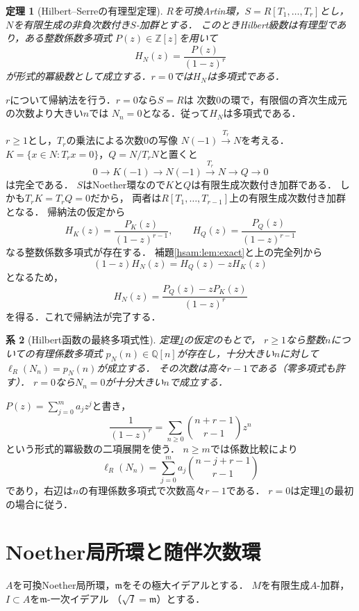\documentclass[a5paper,10pt,onecolumn]{jsarticle}
\makeatletter
\theoremstyle{mathnotetheorem}
\newtheorem{theorem}{定理}[section]
\newtheorem{corollary}[theorem]{系}
\renewcommand{\proofname}{証明}
\renewenvironment{proof}[1][\proofname]{%
  \par\pushQED{\qed}\normalfont\topsep4\p@\@plus2\p@\relax
  \trivlist\item[\hskip\labelsep\bfseries #1]\ignorespaces
}{\popQED\endtrivlist\@endpefalse}
\makeatother
\begin{document}
\begin{theorem}[Hilbert--Serreの有理型定理]\label{hsam:thm:HS}
$R$を可換Artin環，$S=R[T_1,\ldots,T_r]$とし，
$N$を有限生成の非負次数付き$S$-加群とする．
このときHilbert級数は有理型であり，ある整数係数多項式
$P(z)\in\mathbb Z[z]$を用いて
\[
 H_N(z)=\frac{P(z)}{(1-z)^r}
\]
が形式的冪級数として成立する．$r=0$では$H_N$は多項式である．
\end{theorem}
\begin{proof}
$r$について帰納法を行う．$r=0$なら$S=R$は
次数0の環で，有限個の斉次生成元の次数より大きい$n$では
$N_n=0$となる．従って$H_N$は多項式である．

$r\ge1$とし，$T_r$の乗法による次数0の写像
$N(-1)\xrightarrow{T_r}N$を考える．
$K=\{x\in N:T_rx=0\}$，$Q=N/T_rN$と置くと
\[
 0\longrightarrow K(-1)\longrightarrow N(-1)
 \xrightarrow{T_r}N\longrightarrow Q\longrightarrow0
\]
は完全である．
$S$はNoether環なので$K$と$Q$は有限生成次数付き加群である．
しかも$T_rK=T_rQ=0$だから，
両者は$R[T_1,\ldots,T_{r-1}]$上の有限生成次数付き加群となる．
帰納法の仮定から
\[
 H_K(z)=\frac{P_K(z)}{(1-z)^{r-1}},\qquad
 H_Q(z)=\frac{P_Q(z)}{(1-z)^{r-1}}
\]
なる整数係数多項式が存在する．
補題\ref{hsam:lem:exact}と上の完全列から
\[
 (1-z)H_N(z)=H_Q(z)-zH_K(z)
\]
となるため，
\[
 H_N(z)=\frac{P_Q(z)-zP_K(z)}{(1-z)^r}
\]
を得る．これで帰納法が完了する．
\end{proof}

\begin{corollary}[Hilbert函数の最終多項式性]\label{hsam:cor:eventual}
定理\ref{hsam:thm:HS}の仮定のもとで，
$r\ge1$なら整数$n$についての有理係数多項式
$p_N(n)\in\mathbb Q[n]$が存在し，十分大きい$n$に対して
$\ell_R(N_n)=p_N(n)$が成立する．
その次数は高々$r-1$である（零多項式も許す）．
$r=0$なら$N_n=0$が十分大きい$n$で成立する．
\end{corollary}
\begin{proof}
$P(z)=\sum_{j=0}^m a_jz^j$と書き，
\[
 \frac1{(1-z)^r}
 =\sum_{n\ge0}\binom{n+r-1}{r-1}z^n
\]
という形式的冪級数の二項展開を使う．
$n\ge m$では係数比較により
\[
 \ell_R(N_n)=\sum_{j=0}^m
 a_j\binom{n-j+r-1}{r-1}
\]
であり，右辺は$n$の有理係数多項式で次数高々$r-1$である．
$r=0$は定理\ref{hsam:thm:HS}の最初の場合に従う．
\end{proof}

\section{Noether局所環と随伴次数環}
$A$を可換Noether局所環，$\mathfrak m$をその極大イデアルとする．
$M$を有限生成$A$-加群，$I\subset A$を$\mathfrak m$-一次イデアル
（$\sqrt I=\mathfrak m$）とする．
\end{document}
